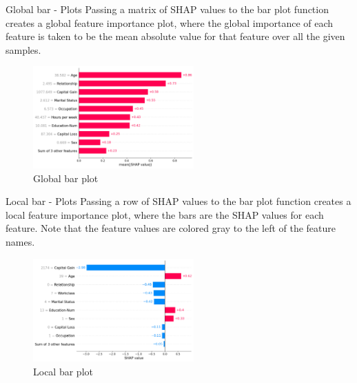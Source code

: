 \documentclass[aspectratio=169]{beamer}
\begin{document}
\begin{frame}{Global bar - Plots}
Passing a matrix of \ac{SHAP} values to the bar plot function creates a global feature importance plot, where the global importance of each feature is taken to be the mean absolute value for that feature over all the given samples.
    \begin{figure}[htbp]
        \centering
        \includegraphics[width=0.55\textwidth]{figs/shap/plots/bar/example_notebooks_api_examples_plots_bar_3_0.png}
        \caption{Global bar plot}
        \label{fig:global-bar}
    \end{figure}
\end{frame}

\begin{frame}{Local bar - Plots}
Passing a row of \ac{SHAP} values to the bar plot function creates a local feature importance plot, where the bars are the \ac{SHAP} values for each feature. Note that the feature values are colored gray to the left of the feature names.
    \begin{figure}[htbp]
        \centering
        \includegraphics[width=0.55\textwidth]{figs/shap/plots/bar/example_notebooks_api_examples_plots_bar_7_0.png}
        \caption{Local bar plot}
        \label{fig:Local-bar}
    \end{figure}
\end{frame}
\end{document}
